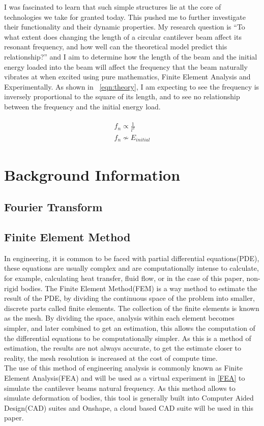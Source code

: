 \documentclass[a4paper,12pt]{article}
\newcommand{\ResearchQ}{To what extent does changing the length of a circular cantilever beam affect its resonant frequency, and how well can the theoretical model predict this relationship?}
\begin{document}
I was fascinated to learn that such simple structures lie at the core of technologies we take for granted today. This pushed me to further investigate their functionality and their dynamic properties. My research question is ``\ResearchQ'' and
I aim to determine how the length of the beam and the initial energy loaded into the beam will affect the frequency that the beam naturally vibrates at when excited using pure mathematics, Finite Element Analysis and Experimentally.
As shown in ~\eqref{eqn:theory}, I am expecting to see the frequency is inversely proportional to the square of its length, and to see no relationship between the frequency and the initial energy load.

\begin{align}
\label{eqn:theory}
\begin{split}
f_{n}\propto \frac{1}{l^{2}}
\\
f_{n}\not\sim E_{initial}
\end{split}
\end{align}






\section{Background Information}%
    \subsection{Fourier Transform}


    \subsection{Finite Element Method}%
    In engineering, it is common to be faced with partial differential equations(PDE), these equations are usually complex and are computationally intense to calculate, for example, calculating heat transfer, fluid flow, or in the case of this paper, non-rigid bodies.
    The Finite Element Method(FEM) is a way method to estimate the result of the PDE, by dividing the continuous space of the problem into smaller, discrete parts called finite elements.
    The collection of the finite elements is known as the mesh. By dividing the space, analysis within each element becomes simpler, and later combined to get an estimation, this allows the computation of the differential equations to be computationally simpler. As this is a method of estimation, the results are not always accurate, to get the estimate closer to reality, the mesh resolution is increased at the cost of compute time.\autocite{FEABook} \\
    The use of this method of engineering analysis is commonly known as Finite Element Analysis(FEA) and will be used as a virtual experiment in \ref{FEA} to simulate the cantilever beams natural frequency.
    As this method allows to simulate deformation of bodies, this tool is generally built into Computer Aided Design(CAD) suites and Onshape, a cloud based CAD suite will be used in this paper.
\end{document}
